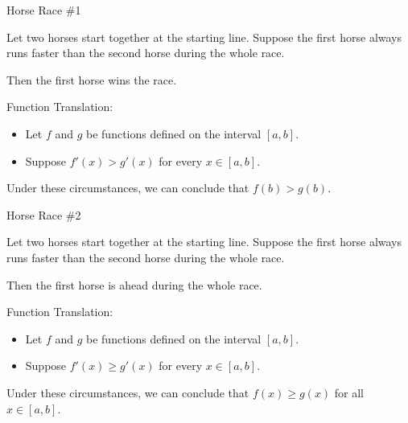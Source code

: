 \documentclass{ximera}
\begin{document}
\begin{idea} Horse Race \#1


Let two horses start together at the starting line. Suppose the first horse always runs faster than the second horse during the whole race.

Then the first horse wins the race.



\begin{model} Function Translation:

\begin{itemize}
\item Let $f$ and $g$ be functions defined on the interval $[a, b]$. 
\item Suppose $f'(x) > g'(x)$ for every $x \in [a,b]$. 
\end{itemize}

Under these circumstances, we can conclude that $f(b) > g(b)$.

\end{model} 




\end{idea}












\begin{idea} Horse Race \#2


Let two horses start together at the starting line. Suppose the first horse always runs faster than the second horse during the whole race.

Then the first horse is ahead during the whole race.



\begin{model} Function Translation:

\begin{itemize}
\item Let $f$ and $g$ be functions defined on the interval $[a, b]$. 
\item Suppose $f'(x) \geq g'(x)$ for every $x \in [a,b]$. 
\end{itemize}

Under these circumstances, we can conclude that $f(x) \geq g(x)$ for all $x \in [a,b]$.

\end{model}

\end{idea}
\end{document}

